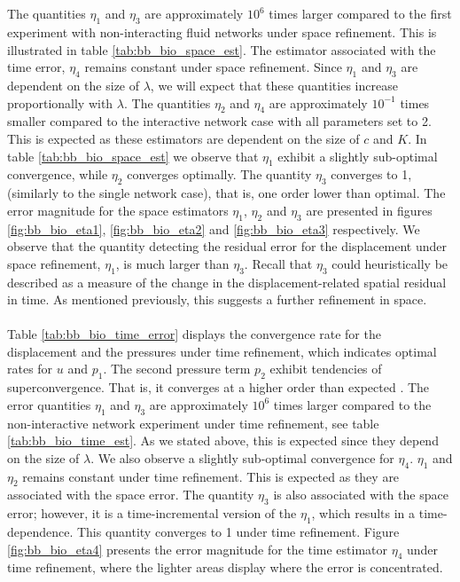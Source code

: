 \\
\\
The quantities $\eta_1$ and $\eta_3$ are approximately $10^6$ times larger compared to the first experiment with non-interacting fluid networks under space refinement. This is illustrated in table \ref{tab:bb_bio_space_est}. The estimator associated with the time error, $\eta_4$ remains constant under space refinement. Since $\eta_1$ and $\eta_3$ are dependent on the size of $\lambda$, we will expect that these quantities increase proportionally with $\lambda$. The quantities $\eta_2$ and $\eta_4$ are approximately $10^{-1}$ times smaller compared to the interactive network case with all parameters set to 2. This is expected as these estimators are dependent on the size of $c$ and $K$. In table \ref{tab:bb_bio_space_est} we observe that $\eta_1$ exhibit a slightly sub-optimal convergence, while $\eta_2$ converges optimally. The quantity $\eta_3$ converges to 1, (similarly to the single network case), that is, one order lower than optimal. The error magnitude for the space estimators $\eta_1$, $\eta_2$ and $\eta_3$ are presented in figures \ref{fig:bb_bio_eta1}, \ref{fig:bb_bio_eta2} and \ref{fig:bb_bio_eta3} respectively. We observe that the quantity detecting the residual error for the displacement under space refinement, $\eta_1$, is much larger than $\eta_3$. Recall that $\eta_3$ could heuristically be described as a measure of the change in the displacement-related spatial residual in time. As mentioned previously, this suggests a further refinement in space. 
\\
\\
Table \ref{tab:bb_bio_time_error} displays the convergence rate for the displacement and the pressures under time refinement, which indicates optimal rates for $u$ and $p_1$. The second pressure term $p_2$ exhibit tendencies of superconvergence. That is, it converges at a higher order than expected \cite{ferreira}. The error quantities $\eta_1$ and $\eta_3$ are approximately $10^6$ times larger compared to the non-interactive network experiment under time refinement, see table \ref{tab:bb_bio_time_est}. As we stated above, this is expected since they depend on the size of $\lambda$. We also observe a slightly sub-optimal convergence for $\eta_4$. $\eta_1$ and $\eta_2$ remains constant under time refinement. This is expected as they are associated with the space error. The quantity $\eta_3$ is also associated with the space error; however, it is a time-incremental version of the $\eta_1$, which results in a time-dependence. This quantity converges to 1 under time refinement. Figure  \ref{fig:bb_bio_eta4} presents the error magnitude for the time estimator $\eta_4$ under time refinement, where the lighter areas display where the error is concentrated. 
